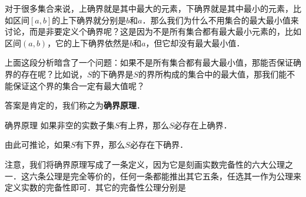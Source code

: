 对于很多集合来说，上确界就是其中最大的元素，下确界就是其中最小的元素，比如区间$[a, b]$的上下确界就分别是$b$和$a$．那么我们为什么不用集合的最大最小值来讨论，而是非要定义个确界呢？这是因为不是所有集合都有最大最小元素的，比如区间$(a, b)$，它的上下确界依然是$b$和$a$，但它却没有最大最小值．

上面这段分析暗含了一个问题：如果不是所有集合都有最大最小值，那能否保证确界的存在呢？比如说，$S$的下确界是$S$的界所构成的集合中的最大值，那我们能不能保证这个界的集合一定有最大值呢？

答案是肯定的，我们称之为\textbf{确界原理}．

\begin{definition}{确界原理}
如果非空的实数子集$S$有上界，那么$S$必存在上确界．

由此可推论，如果$S$有下界，那么$S$必存在下确界．
\end{definition}

注意，我们将确界原理写成了一条定义，因为它是刻画实数完备性的六大公理之一．这六条公理是完全等价的，任何一条都能推出其它五条，任选其一作为公理来定义实数的完备性即可．其它的完备性公理分别是























